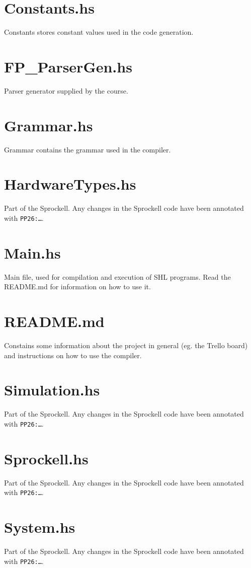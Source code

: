 \documentclass[twoside]{report}
\begin{document}
\section{Constants.hs}
Constants stores constant values used in the code generation. %

\section{FP\_{}ParserGen.hs}
Parser generator supplied by the course.

\section{Grammar.hs}
Grammar contains the grammar used in the compiler.

\section{HardwareTypes.hs}
Part of the Sprockell. Any changes in the Sprockell code have been annotated with \texttt{PP26:\ldots}.

\section{Main.hs}
Main file, used for compilation and execution of SHL programs. Read the README.md for information on how to use it.

\section{README.md}
Constains some information about the project in general (eg. the Trello board) and instructions on how to use the compiler.

\section{Simulation.hs}
Part of the Sprockell. Any changes in the Sprockell code have been annotated with \texttt{PP26:\ldots}.

\section{Sprockell.hs}
Part of the Sprockell. Any changes in the Sprockell code have been annotated with \texttt{PP26:\ldots}.

\section{System.hs}
Part of the Sprockell. Any changes in the Sprockell code have been annotated with \texttt{PP26:\ldots}.
\end{document}
